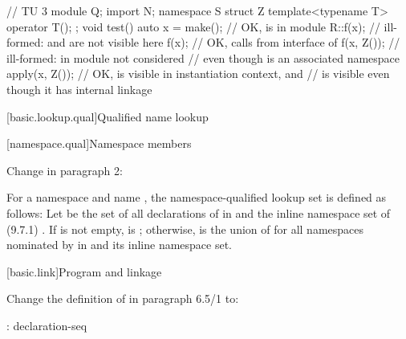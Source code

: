 \begin{std.txt}
\begin{codeblock}
// TU 3
module Q;
import N;
namespace S {
  struct Z { template<typename T> operator T(); };
}
void test() {
  auto x = make(); // OK,  is  in module 
  R::f(x);         // ill-formed:  and  are not visible here
  f(x);            // OK, calls  from interface of 
  f(x, Z());       // ill-formed:  in module  not considered
                   // even though  is an associated namespace
  apply(x, Z());   // OK,  is visible in instantiation context, and
                   //  is visible even though it has internal linkage
}
\end{codeblock}
\added{\exitexample}
\end{std.txt}

\setcounter{subsection}{2}
[basic.lookup.qual]{Qualified name lookup}

\setcounter{subsubsection}{1}
[namespace.qual]{Namespace members}

Change in paragraph 2:

\begin{std.txt}
\pnum[2]
For a namespace 
and name ,
the namespace-qualified lookup set  is defined as follows:
Let  be the set of all declarations of  in 
and the inline namespace set of  (9.7.1)
.
If  is not empty,  is ;
otherwise,  is the union of 
for all namespaces  nominated by 
in  and its inline namespace set.
\end{std.txt}

\setcounter{section}{4}
[basic.link]{Program and linkage}%

Change the definition of  in paragraph 6.5/1
to:

\begin{bnf}
:\br
    declaration-seq\opt\br
\end{bnf}

\begin{bnf}
\end{bnf}

